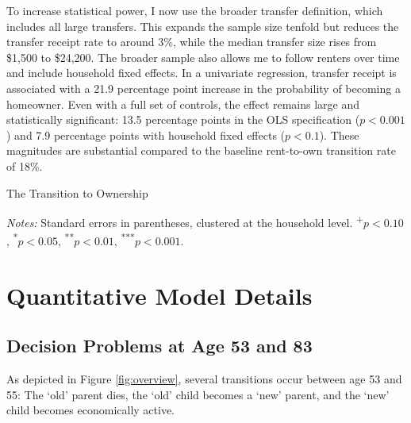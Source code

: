 \documentclass[12pt]{article}
\begin{document}
To increase statistical power, I now use the broader transfer definition, which includes all large transfers. This expands the sample size tenfold but reduces the transfer receipt rate to around 3\%, while the median transfer size rises from \$1,500 to \$24,200. The broader sample also allows me to follow renters over time and include household fixed effects. In a univariate regression, transfer receipt is associated with a 21.9 percentage point increase in the probability of becoming a homeowner. Even with a full set of controls, the effect remains large and statistically significant: 13.5 percentage points in the OLS specification ($p<0.001$) and 7.9 percentage points with household fixed effects ($p<0.1$). These magnitudes are substantial compared to the baseline rent-to-own transition rate of 18\%.

\begin{table}
	\center
	\begin{threeparttable}
		\caption{The Transition to Ownership}
		\label{tab:newowners}
		\small 
		

		{\begin{footnotesize}\begin{flushleft}
		\textit{Notes:} Standard errors in parentheses, clustered at the household level. \textsuperscript{+}$p<0.10$, \textsuperscript{*}$p<0.05$, \textsuperscript{**}$p<0.01$, \textsuperscript{***}$p<0.001$.
		\end{flushleft}\end{footnotesize}}		
	\end{threeparttable}
\end{table}


\section{Quantitative Model Details} 

\subsection{Decision Problems at Age 53 and 83}\label{sec:decextra}
As depicted in Figure \ref{fig:overview}, several transitions occur between age 53 and 55: The `old' parent dies, the `old' child becomes a `new' parent, and the `new' child becomes economically active. 
\end{document}
